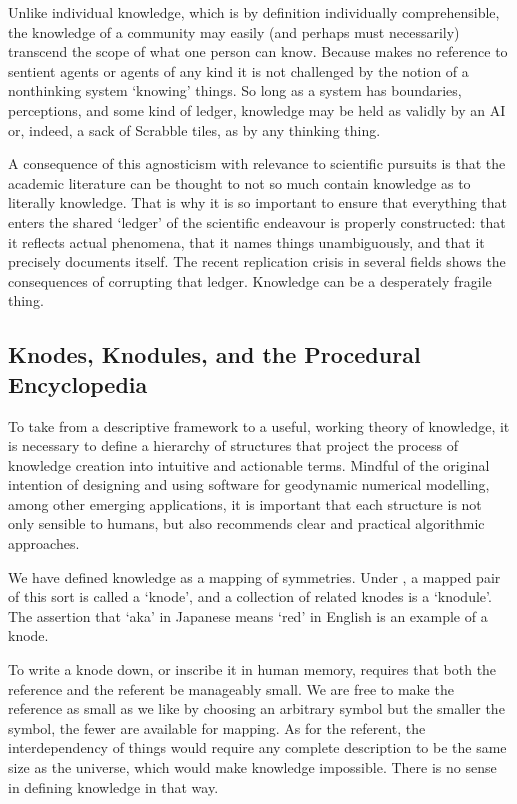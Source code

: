 \documentclass[letterpaper,10pt,english]{jupyterBook}
\begin{document}
\sphinxAtStartPar
Unlike individual knowledge, which is by definition individually comprehensible, the knowledge of a community may easily (and perhaps must necessarily) transcend the scope of what one person can know. Because  makes no reference to sentient agents \sphinxhyphen{} or agents of any kind \sphinxhyphen{} it is not challenged by the notion of a non\sphinxhyphen{}thinking system ‘knowing’ things. So long as a system has boundaries, perceptions, and some kind of ledger, knowledge may be held as validly by an AI or, indeed, a sack of Scrabble tiles, as by any thinking thing.

\sphinxAtStartPar
A consequence of this agnosticism with relevance to scientific pursuits is that the academic literature can be thought to not so much contain knowledge as to literally  knowledge. That is why it is so important to ensure that everything that enters the shared ‘ledger’ of the scientific endeavour is properly constructed: that it reflects actual phenomena, that it names things unambiguously, and that it precisely documents itself. The recent replication crisis in several fields shows the consequences of corrupting that ledger. Knowledge can be a desperately fragile thing.


\subsection{Knodes, Knodules, and the Procedural Encyclopedia}
\label{\detokenize{content/chapter_03_everest/doctrine:knodes-knodules-and-the-procedural-encyclopedia}}
\sphinxAtStartPar
To take  from a descriptive framework to a useful, working theory of knowledge, it is necessary to define a hierarchy of structures that project the process of knowledge creation into intuitive and actionable terms. Mindful of the original intention of designing and using software for geodynamic numerical modelling, among other emerging applications, it is important that each structure is not only sensible to humans, but also recommends clear and practical algorithmic approaches.

\sphinxAtStartPar
We have defined knowledge as a mapping of symmetries. Under , a mapped pair of this sort is called a ‘knode’, and a collection of related knodes is a ‘knodule’. The assertion that ‘aka’ in Japanese means ‘red’ in English is an example of a knode.

\sphinxAtStartPar
To write a knode down, or inscribe it in human memory, requires that both the reference and the referent be manageably small. We are free to make the reference as small as we like by choosing an arbitrary symbol \sphinxhyphen{} but the smaller the symbol, the fewer are available for mapping. As for the referent, the interdependency of things would require any complete description to be the same size as the universe, which would make knowledge impossible. There is no sense in defining knowledge in that way.
\end{document}
